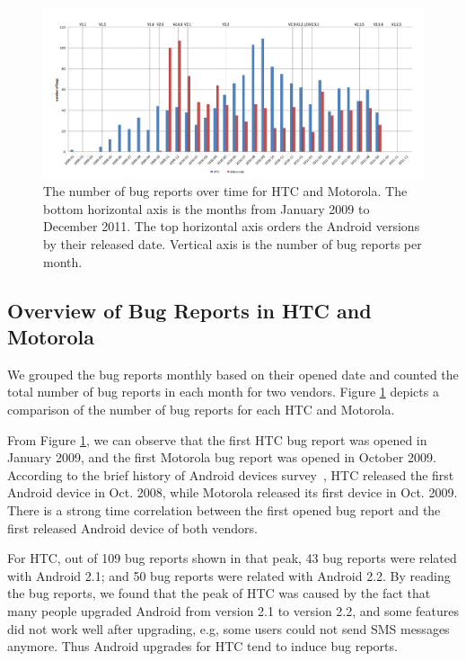 \documentclass[10pt, conference, compsocconf]{IEEEtran}
\begin{document}
\begin{figure}[htb]
\centering
\includegraphics[width=1\textwidth]{bugovertime.png}
\caption{The number of bug reports over time for HTC and Motorola. The
  bottom
  horizontal axis is the months from January 2009 to December 2011. The top
  horizontal axis orders the Android versions by their released
  date. Vertical axis is the number of bug reports per month.}
\label{bugovertime}
\end{figure}

\subsection{Overview of Bug Reports in HTC and Motorola}

We grouped the bug reports monthly based on their opened date and
counted the total number of bug reports in each month for two
vendors. 
Figure \ref{bugovertime} depicts a comparison of the number
of bug reports for each HTC and Motorola.


From Figure \ref{bugovertime}, we can observe that the first HTC bug
report was opened in January 2009, and the first Motorola bug report
was opened in October 2009.
According to the brief history of Android devices
survey~\cite{historyofandroid}, HTC released the first Android device
in Oct. 2008, while Motorola released its first device in Oct. 2009.
There is a strong time correlation between the first
opened bug report and the first released Android device of both
vendors.


For HTC, out of 109 bug reports shown in that peak, 43 bug reports
were related with Android 2.1;
 and 50 bug reports were related with Android 2.2. 
By reading the bug reports, we found that the peak of HTC was caused
by the fact that many people upgraded Android from version 2.1 to
version 2.2,
and some features did not work well after upgrading, e.g, some users
could not send SMS messages anymore.
Thus Android upgrades for HTC tend to induce bug reports.
\end{document}
